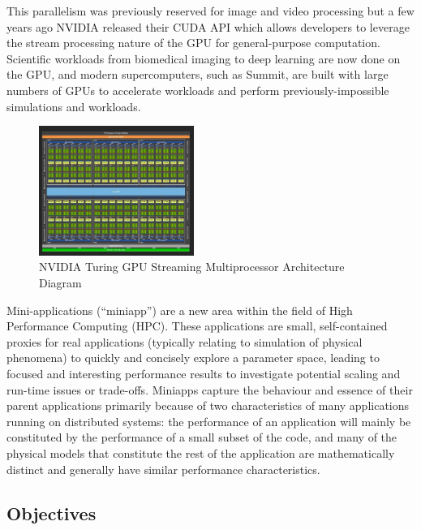 \documentclass[conference]{IEEEtran}
\begin{document}
This parallelism was previously reserved for image and video processing but a few years ago NVIDIA released their CUDA API\cite{cuda_talk}\cite{CUDA} which allows developers to leverage the stream processing nature of the GPU for general-purpose computation. Scientific workloads from biomedical imaging\cite{luebke2008cuda} to deep learning\cite{tang2013deep} are now done on the GPU, and modern supercomputers, such as Summit, are built with large numbers of GPUs to accelerate workloads and perform previously-impossible simulations and workloads.

\begin{figure}
\centering
\includegraphics[width=0.45\textwidth]{images/gpu_diagram.jpg}
\caption{NVIDIA Turing GPU Streaming Multiprocessor Architecture Diagram}
\label{fig:gpu_diagram}
\end{figure}

Mini-applications (``miniapp”) are a new area within the field of High Performance Computing (HPC). These applications are small, self-contained proxies for real applications (typically relating to simulation of physical phenomena) to quickly and concisely explore a parameter space, leading to focused and interesting performance results to investigate potential scaling and run-time issues or trade-offs\cite{miniapps}. Miniapps capture the behaviour and essence of their parent applications primarily because of two characteristics of many applications running on distributed systems: the performance of an application will mainly be constituted by the performance of a small subset of the code, and many of the physical models that constitute the rest of the application are mathematically distinct and generally have similar performance characteristics\cite{miniapps}.

\subsection{Objectives}
\end{document}
